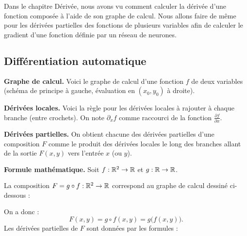 
Dans le chapitre \og{}Dérivée\fg{}, nous avons vu comment calculer la dérivée d'une fonction composée à l'aide de son graphe de calcul. Nous allons faire de même pour les dérivées partielles des fonctions de plusieurs variables afin de calculer le gradient d'une fonction définie par un réseau de neurones.

\subsection{Différentiation automatique}

\textbf{Graphe de calcul.}
Voici le graphe de calcul d'une fonction $f$ de deux variables (schéma de principe à gauche, évaluation en $(x_0,y_0)$ à droite).



\bigskip
\textbf{Dérivées locales.}
Voici la règle pour les dérivées locales à rajouter à chaque branche (entre crochets).
On note $\partial_x f$ comme raccourci de la fonction $\frac{\partial f}{\partial x}$.


\bigskip
\textbf{Dérivées partielles.}
On obtient chacune des dérivées partielles d'une composition $F$ comme le produit des dérivées locales le long des branches allant de la sortie $F(x,y)$ vers l'entrée $x$ (ou $y$).


\bigskip
\textbf{Formule mathématique.}
Soit $f : \mathbb{R}^2 \to \mathbb{R}$ et $g : \mathbb{R} \to \mathbb{R}$. 

La composition $F = g \circ f : \mathbb{R}^2 \to \mathbb{R}$ correspond au graphe de calcul dessiné ci-dessous :

On a donc :
$$F(x,y) = g \circ f (x,y) = g \big( f(x,y) \big).$$
Les dérivées partielles de $F$ sont données par les formules :

